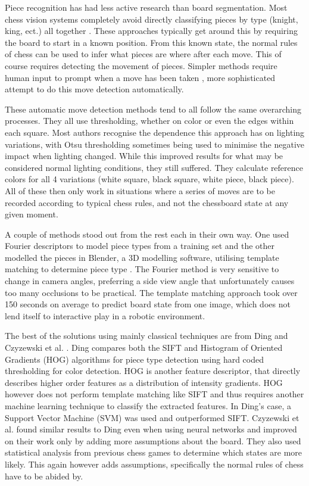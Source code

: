 Piece recognition has had less active research than board segmentation.  Most chess vision systems completely avoid directly classifying pieces by
type (knight, king, ect.) all together \cite{Koray2016ACV, bowers_2014, larregay2018design, irobot}.  
These approaches typically get around this by requiring the board to start in a known position.
From this known state, the normal rules of chess can be used to infer what pieces are where after each move.  This of course requires detecting 
the movement of pieces.  Simpler methods
require human input to prompt when a move has been taken \cite{CVChess}, more sophisticated attempt to do this move detection automatically.

These automatic move detection methods tend to all follow the same overarching processes.  They all use thresholding, 
whether on color or even the edges within each square.
Most authors recognise the dependence this approach has on lighting variations, with Otsu thresholding \cite{otsu} sometimes being used to minimise
the negative impact when lighting changed.  While this improved results for what may be considered normal lighting conditions, they still suffered.
They calculate reference colors for all 4 variations (white square, black square, white piece, black piece).
All of these then only work in situations where a series of moves are to be recorded according to typical chess rules, and not the chessboard state at any given moment.

A couple of methods stood out from the rest each in their own way.  One used Fourier descriptors to model piece types from a training set \cite{Danner2015VisualCR}
and the other modelled the pieces in Blender, a 3D modelling software, utilising template matching to determine piece type \cite{oremuvschess}.  The Fourier method is very sensitive
to change in camera angles, preferring a side view angle that unfortunately causes too many occlusions to be practical.  The template matching approach
took over 150 seconds on average to predict board state from one image, which does not lend itself to interactive play in a robotic environment.

The best of the solutions using mainly classical techniques are from Ding \cite{Ding2016ChessVisionC} and Czyzewski et al. \cite{heatmap}.  
Ding compares both the SIFT and Histogram of Oriented Gradients (HOG) algorithms for piece type detection using hard coded thresholding for color detection.  
HOG is another feature descriptor, that directly describes higher order features as a distribution of intensity gradients.
HOG however does not perform template matching like SIFT and thus requires another machine learning technique to classify the extracted features.  In Ding's case,
a Support Vector Machine (SVM) was used and outperformed SIFT.
Czyzewski et al. found similar results to Ding even when using neural networks and improved on their work only by 
adding more assumptions about the board.  They also used statistical analysis from previous chess games to determine which states are more likely.  
This again however adds assumptions, specifically the normal rules of chess have to be abided by.

